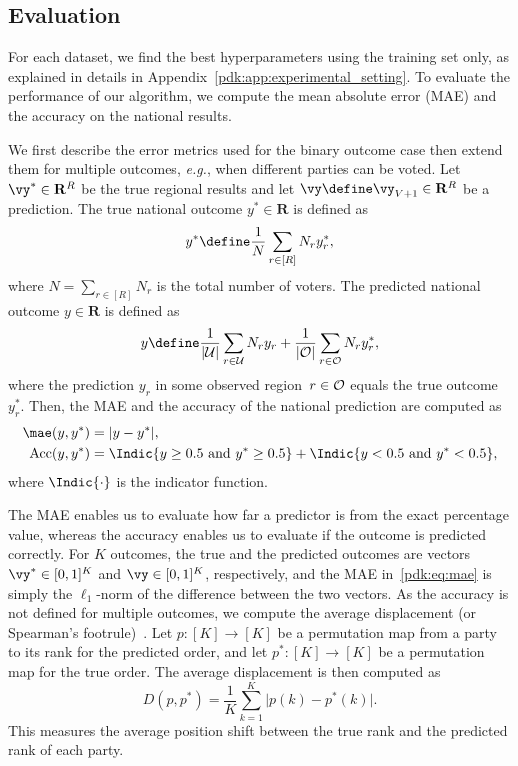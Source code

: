 \subsection{Evaluation}

For each dataset, we find the best hyperparameters using the training set only, as explained in details in Appendix~\ref{pdk:app:experimental_setting}.
To evaluate the performance of our algorithm, we compute the mean absolute error (MAE) and the accuracy on the national results.

We first describe the error metrics used for the binary outcome case then extend them for multiple outcomes, \textit{e.g.}, when different parties can be voted.
Let $\vy^* \in \mathbf{R}^R$ be the true regional results and let $\vy \define \vy_{V+1} \in \mathbf{R}^R$ be a prediction.
The true national outcome $y^* \in \mathbf{R}$ is defined as
\begin{equation}
	y^* \define \frac{1}{N} \sum_{r \in [R]} N_r y_r^*,
\end{equation}
where $N = \sum_{r \in [R]} N_r$ is the total number of voters.
The predicted national outcome $y \in \mathbf{R}$ is defined as
\begin{equation}
	y \define \frac{1}{\vert \Ubs \vert} \sum_{r \in \Ubs} N_r y_r + \frac{1}{\vert \Obs \vert} \sum_{r \in \Obs} N_r y_r^*,
\end{equation}
where the prediction $y_r$ in some observed region~$r \in \mathcal{O}$ equals the true outcome $y_r^*$.
Then, the MAE and the accuracy of the national prediction are computed as
\begin{align}
	\mae(y, y^*)         & = \vert y - y^* \vert, \label{pdk:eq:mae}                                                                                  \\
	\textrm{Acc}(y, y^*) & = \Indic{y \geq 0.5 \textrm{ and } y^* \geq 0.5} \nonumber + \Indic{ y < 0.5 \textrm{ and } y^* < 0.5}, \label{pdk:eq:acc}
\end{align}
where $\Indic{\cdot}$ is the indicator function.

The MAE enables us to evaluate how far a predictor is from the exact percentage value, whereas the accuracy enables us to evaluate if the outcome is predicted correctly.
For $K$ outcomes, the true and the predicted outcomes are vectors $\vy^* \in [0, 1]^K$ and $\vy \in [0, 1]^K$, respectively, and the MAE in~\eqref{pdk:eq:mae} is simply the $\ell_1$-norm of the difference between the two vectors.
As the accuracy is not defined for multiple outcomes, we compute the average displacement (or Spearman's footrule)~\cite{diaconis1977spearman}.
Let \mbox{$p: [K] \rightarrow [K]$} be a permutation map from a party to its rank for the predicted order, and let \mbox{$p^*: [K] \rightarrow [K]$} be a permutation map for the true order.
The average displacement is then computed as
\begin{equation}
	\label{pdk:eq:displacement}
	D(p, p^*) = \frac{1}{K} \sum_{k=1}^K \vert p(k) - p^*(k) \vert.
\end{equation}
This measures the average position shift between the true rank and the predicted rank of each party.

